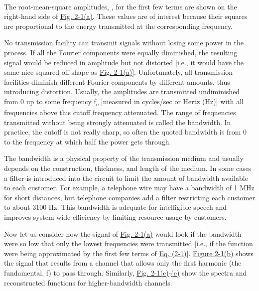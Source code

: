 

~

The root-mean-square amplitudes,
, for the
first few terms are shown on the right-hand side of
\protect\hyperlink{0130661023_ch02lev1sec1.htmlux5cux23ch02fig01}{Fig.
2-1(a)}. These values are of interest because their squares are
proportional to the energy transmitted at the corresponding frequency.

No transmission facility can transmit signals without losing some power
in the process. If all the Fourier components were equally diminished,
the resulting signal would be reduced in amplitude but not distorted
{[}i.e., it would have the same nice squared-off shape as
\protect\hyperlink{0130661023_ch02lev1sec1.htmlux5cux23ch02fig01}{Fig.
2-1(a)}{]}. Unfortunately, all transmission facilities diminish
different Fourier components by different amounts, thus introducing
distortion. Usually, the amplitudes are transmitted undiminished from 0
up to some frequency {f}{\textsubscript{c}} {[}measured in cycles/sec or
Hertz (Hz){]} with all frequencies above this cutoff frequency
attenuated. The range of frequencies transmitted without being strongly
attenuated is called the {bandwidth}. In practice, the cutoff is not
really sharp, so often the quoted bandwidth is from 0 to the frequency
at which half the power gets through.

The bandwidth is a physical property of the transmission medium and
usually depends on the construction, thickness, and length of the
medium. In some cases a filter is introduced into the circuit to limit
the amount of bandwidth available to each customer. For example, a
telephone wire may have a bandwidth of 1 MHz for short distances, but
telephone companies add a filter restricting each customer to about 3100
Hz. This bandwidth is adequate for intelligible speech and improves
system-wide efficiency by limiting resource usage by customers.

Now let us consider how the signal of
\protect\hyperlink{0130661023_ch02lev1sec1.htmlux5cux23ch02fig01}{Fig.
2-1(a)} would look if the bandwidth were so low that only the lowest
frequencies were transmitted {[}i.e., if the function were being
approximated by the first few terms of
\protect\hyperlink{0130661023_ch02lev1sec1.htmlux5cux23ch02eq01}{Eq.
(2-1)}{]}.
\protect\hyperlink{0130661023_ch02lev1sec1.htmlux5cux23ch02fig01}{Figure
2-1(b)} shows the signal that results from a channel that allows only
the first harmonic (the fundamental, {f}) to pass through. Similarly,
\protect\hyperlink{0130661023_ch02lev1sec1.htmlux5cux23ch02fig01}{Fig.
2-1(c)}-\protect\hyperlink{0130661023_ch02lev1sec1.htmlux5cux23ch02fig01}{(e)}
show the spectra and reconstructed functions for higher-bandwidth
channels.

